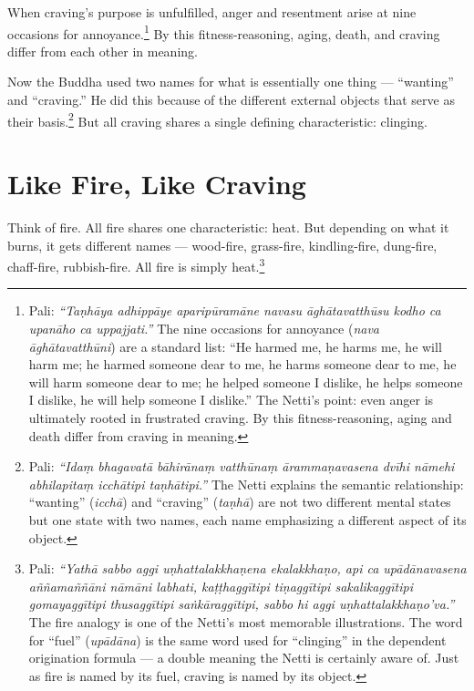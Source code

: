 When craving's purpose is unfulfilled, anger and resentment arise at nine occasions for annoyance.\footnote{Pali: \textit{``Taṇhāya adhippāye aparipūramāne navasu āghātavatthūsu kodho ca upanāho ca uppajjati.''} The nine occasions for annoyance (\textit{nava āghātavatthūni}) are a standard list: ``He harmed me, he harms me, he will harm me; he harmed someone dear to me, he harms someone dear to me, he will harm someone dear to me; he helped someone I dislike, he helps someone I dislike, he will help someone I dislike.'' The Netti's point: even anger is ultimately rooted in frustrated craving. By this fitness-reasoning, aging and death differ from craving in meaning.} By this fitness-reasoning, aging, death, and craving differ from each other in meaning.

Now the Buddha used two names for what is essentially one thing --- ``wanting'' and ``craving.'' He did this because of the different external objects that serve as their basis.\footnote{Pali: \textit{``Idaṃ bhagavatā bāhirānaṃ vatthūnaṃ ārammaṇavasena dvīhi nāmehi abhilapitaṃ icchātipi taṇhātipi.''} The Netti explains the semantic relationship: ``wanting'' (\textit{icchā}) and ``craving'' (\textit{taṇhā}) are not two different mental states but one state with two names, each name emphasizing a different aspect of its object.} But all craving shares a single defining characteristic: clinging.

\section*{Like Fire, Like Craving}

Think of fire. All fire shares one characteristic: heat. But depending on what it burns, it gets different names --- wood-fire, grass-fire, kindling-fire, dung-fire, chaff-fire, rubbish-fire. All fire is simply heat.\footnote{Pali: \textit{``Yathā sabbo aggi uṇhattalakkhaṇena ekalakkhaṇo, api ca upādānavasena aññamaññāni nāmāni labhati, kaṭṭhaggītipi tiṇaggītipi sakalikaggītipi gomayaggītipi thusaggītipi saṅkāraggītipi, sabbo hi aggi uṇhattalakkhaṇo'va.''} The fire analogy is one of the Netti's most memorable illustrations. The word for ``fuel'' (\textit{upādāna}) is the same word used for ``clinging'' in the dependent origination formula --- a double meaning the Netti is certainly aware of. Just as fire is named by its fuel, craving is named by its object.}

